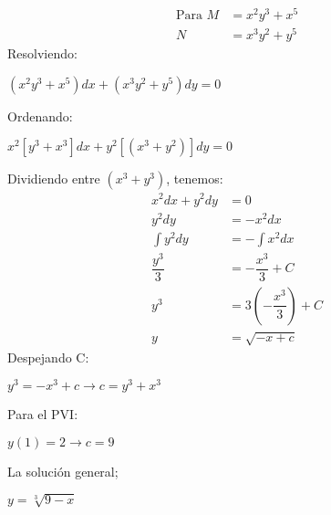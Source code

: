 \begin{enumerate}
\begin{enumerate}
    \begin{align*}
        \text{Para } M &= x^{2}y^{3}+x^{5}\\
        N & = x^{3}y^{2}+y^{5}
    \end{align*}
 Resolviendo:
 \begin{center}
     $(x^2y^3+x^5)dx+(x^3y^2+y^5)dy=0$
 \end{center}
 Ordenando:
 \begin{center}
     $x^2[y^3+x^3]dx+y^2[(x^3+y^2)]dy=0$
 \end{center}
 Dividiendo entre $(x^3+y^3)$, tenemos:
 \begin{align*}
     x^2dx+y^2dy&=0\\
     y^2dy&=-x^2dx\\
     \int y^2dy&=-\int x^2 dx\\
     \dfrac{y^3}{3}&=-\dfrac{x^3}{3}+C\\
     y^3&=3(-\dfrac{x^3}{3})+C\\
     y&=\sqrt{-x+c}
 \end{align*}
 Despejando C:
 \begin{center}
     $y^3=-x^3+c\rightarrow c=y^3+x^3$
 \end{center}
 Para el PVI:
 \begin{center}
     $y(1)=2\rightarrow c=9$
 \end{center}
 La solución general;
 \begin{center}
     $y=\sqrt[3]{9-x}$
 \end{center}
\end{enumerate}
\end{enumerate}
